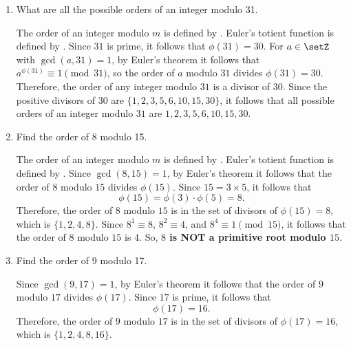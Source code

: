 \begin{enumerate}
\begin{subprove}
    For $g \in \setZ$ with $\gcd(g,m)=1$, by Euler's theorem it follows that the 
    order of $g$ modulo $m$ divides $\phi(m)$.
    When the order of $g$ modulo $m$ equals $\phi(m)$, it follows that the powers 
    $g, g^2, \ldots, g^{\phi(m)}$ are all distinct modulo $m$ and represent all 
    elements of $(\setZ/m\setZ)^\times$.
    Therefore, a primitive root $g$ modulo $m$ exists if and only if the 
    multiplicative group $(\setZ/m\setZ)^\times$ is cyclic.
  \end{subprove}
  \item What are all the possible orders of an integer modulo 31.
  \begin{subanswer}
    The order of an integer modulo $m$ is defined by .
    Euler's totient function is defined by .
    Since $31$ is prime, it follows that $\phi(31) = 30$.
    For $a \in \setZ$ with $\gcd(a, 31) = 1$, by Euler's theorem it follows that $a^{\phi(31)} \equiv 1 \pmod{31}$, so the order of $a$ modulo $31$ divides $\phi(31) = 30$.
    Therefore, the order of any integer modulo $31$ is a divisor of $30$.
    Since the positive divisors of $30$ are $\{1, 2, 3, 5, 6, 10, 15, 30\}$, it follows that all possible orders of an integer modulo $31$ are $1, 2, 3, 5, 6, 10, 15, 30$.
  \end{subanswer}
  \item Find the order of 8 modulo 15.
  \begin{subanswer}
    The order of an integer modulo $m$ is defined by .
    Euler's totient function is defined by .
    Since $\gcd(8,15)=1$, by Euler's theorem it follows that the order of $8$ modulo $15$ divides $\phi(15)$.
    Since $15 = 3 \times 5$, it follows that
    \[
    \phi(15) = \phi(3) \cdot \phi(5) = 8.
    \]
    Therefore, the order of $8$ modulo $15$ is in the set of divisors of $\phi(15) = 8$, which is $\{1, 2, 4, 8\}$.
    Since $8^1 \equiv 8$, $8^2 \equiv 4$, and $8^4 \equiv 1 \pmod{15}$, 
    it follows that the order of $8$ modulo $15$ is $4$. So, \textbf{$8$ is NOT a primitive root modulo $15$}.
  \end{subanswer}
  \item Find the order of 9 modulo 17.
  \begin{subanswer}
    Since $\gcd(9,17)=1$, by Euler's theorem it follows that the order of $9$ modulo $17$ divides $\phi(17)$.
    Since $17$ is prime, it follows that
    \[
    \phi(17) = 16.
    \]
    Therefore, the order of $9$ modulo $17$ is in the set of divisors of $\phi(17) = 16$, which is $\{1, 2, 4, 8, 16\}$.

\end{subanswer}
\end{enumerate}
